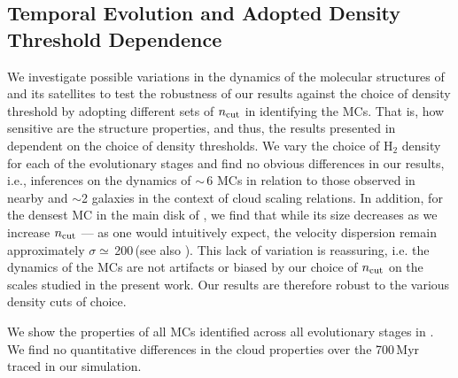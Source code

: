 \IfFileExists{emulateapjlegacy.cls}{\documentclass[iop]{emulateapjlegacy}}{\documentclass[iop]{emulateapj}}
\begin{document}
\subsection{Temporal Evolution and Adopted Density Threshold Dependence}\label{sec:ncut}
We investigate possible variations in the dynamics of the molecular structures of \flower and its satellites to test the robustness of our results against the choice of density threshold by adopting different sets of $n_{\rm cut}$ in identifying the MCs. That is, how sensitive are the structure properties, and thus, the results presented in  dependent on the choice of density thresholds.
%
We vary the choice of H$_2$ density for each of the evolutionary stages and find no obvious differences in our results, i.e., inferences on the dynamics of \z$\sim$\,6 MCs in relation to those observed in nearby and \z$\sim$2 galaxies in the context of cloud scaling relations.
%
In addition, for the densest MC in the main disk of \flower, we find that while its size decreases as we increase $n_{\rm cut}$ --- as one would intuitively expect, the velocity dispersion remain approximately $\sigma\simeq$\,200\,\kms (see also ).
%
This lack of variation is reassuring, i.e. the dynamics of the MCs are not artifacts or biased by our choice of $n_{\rm cut}$ on the scales studied in the present work. Our results are therefore robust to the various density cuts of choice.

We show the properties of all MCs identified across all evolutionary stages in . We find no quantitative differences in the cloud properties over the 700\,Myr traced in our simulation.
\end{document}
